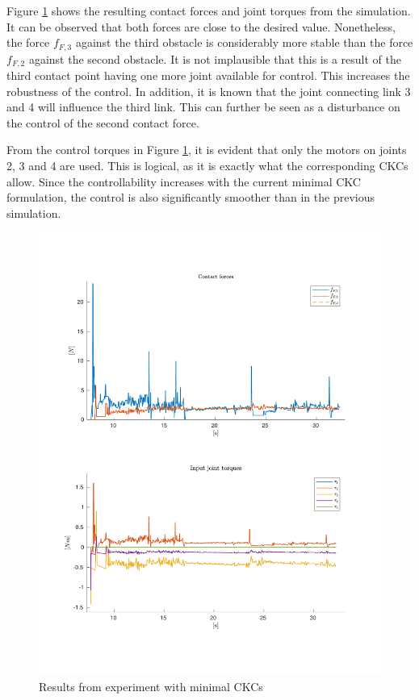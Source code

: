 Figure \ref{fig:2xf-miniJ} shows the resulting contact forces and joint torques from the simulation. It can be observed that both forces are close to the desired value. Nonetheless, the force $f_{F,3}$ against the third obstacle is considerably more stable than the force $f_{F,2}$ against the second obstacle. It is not implausible that this is a result of the third contact point having one more joint available for control. This increases the robustness of the control. In addition, it is known that the joint connecting link 3 and 4 will influence the third link. This can further be seen as a disturbance on the control of the second contact force.

From the control torques in Figure \ref{fig:2xf-miniJ}, it is evident that only the motors on joints 2, 3 and 4 are used. This is logical, as it is exactly what the corresponding CKCs allow. Since the controllability increases with the current minimal CKC formulation, the control is also significantly smoother than in the previous simulation.

\begin{figure}[H]
    \centering
    \includegraphics[trim=1.5cm 2cm 2cm 2cm, clip=true, width=\textwidth]{figures/experiments/2xf/miniJ-2plot.pdf}
    \caption{Results from experiment with minimal CKCs}
    \label{fig:2xf-miniJ}
\end{figure}




